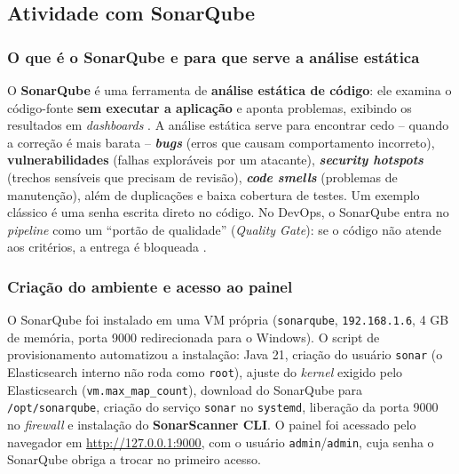 \subsection{Atividade com SonarQube}\label{sec:sonarqube}

\subsubsection{O que é o SonarQube e para que serve a análise estática}

O \textbf{SonarQube} é uma ferramenta de \textbf{análise estática de código}: ele examina o
código-fonte \textbf{sem executar a aplicação} e aponta problemas, exibindo os resultados em
\textit{dashboards} \citep{sonar2026}. A análise estática serve para encontrar cedo -- quando a
correção é mais barata -- \textbf{\textit{bugs}} (erros que causam comportamento incorreto),
\textbf{vulnerabilidades} (falhas exploráveis por um atacante), \textbf{\textit{security hotspots}}
(trechos sensíveis que precisam de revisão), \textbf{\textit{code smells}} (problemas de manutenção),
além de duplicações e baixa cobertura de testes. Um exemplo clássico é uma senha escrita direto no
código. No DevOps, o SonarQube entra no \textit{pipeline} como um ``portão de qualidade''
(\textit{Quality Gate}): se o código não atende aos critérios, a entrega é bloqueada \citep{muniz2026}.

\subsubsection{Criação do ambiente e acesso ao painel}

O SonarQube foi instalado em uma VM própria (\texttt{sonarqube}, \texttt{192.168.1.6}, 4 GB de
memória, porta 9000 redirecionada para o Windows). O script de provisionamento automatizou a
instalação: Java 21, criação do usuário \texttt{sonar} (o Elasticsearch interno não roda como
\texttt{root}), ajuste do \textit{kernel} exigido pelo Elasticsearch (\texttt{vm.max\_map\_count}),
download do SonarQube para \texttt{/opt/sonarqube}, criação do serviço \texttt{sonar} no
\texttt{systemd}, liberação da porta 9000 no \textit{firewall} e instalação do \textbf{SonarScanner
CLI}. O painel foi acessado pelo navegador em \url{http://127.0.0.1:9000}, com o usuário
\texttt{admin}/\texttt{admin}, cuja senha o SonarQube obriga a trocar no primeiro acesso.


